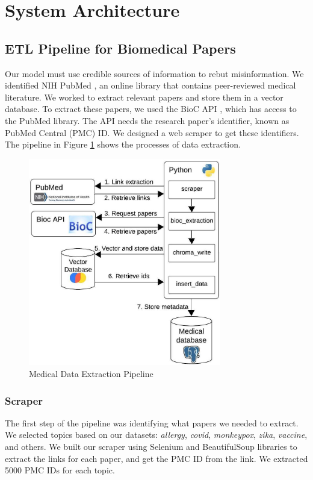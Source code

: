 
\section{System Architecture}

\subsection{ETL Pipeline for Biomedical Papers}

Our model must use credible sources of information to rebut misinformation. We identified NIH PubMed \cite{pubmed}, an online library that contains peer-reviewed medical literature. We worked to extract relevant papers and store them in a vector database. To extract these papers, we used the BioC API \cite{bioinformatics}, which has access to the PubMed library. The API needs the research paper's identifier, known as PubMed Central (PMC) ID. We designed a web scraper to get these identifiers. The pipeline in Figure \ref{fig:etl} shows the processes of data extraction. 

\begin{figure}[!htb]
	\begin{center}
		\includegraphics[width=0.75\textwidth]{figures/ETL_Pipeline.jpeg}
	\end{center}
	\caption{Medical Data Extraction Pipeline} 
	\label{fig:etl}
\end{figure}

\subsubsection{Scraper}
The first step of the pipeline was identifying what papers we needed to extract. We selected topics based on our datasets: \textit{allergy}, \textit{covid}, \textit{monkeypox}, \textit{zika}, \textit{vaccine}, and others. We built our scraper using Selenium and BeautifulSoup libraries to extract the links for each paper, and get the PMC ID  from the link.  We extracted 5000 PMC IDs for each topic.

